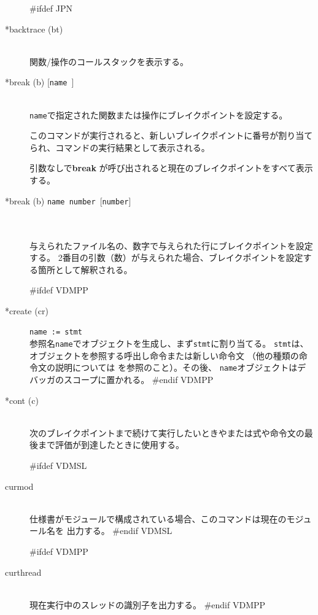 \documentclass[\pformat,12pt]{article}
\begin{document}
\begin{description}
#ifdef JPN
\item[*backtrace (bt)] \mbox{}\\
  関数/操作のコールスタックを表示する。
  
\item[*break (b) \mbox{[{\tt name }]}] 
\mbox{}\\
  {\tt name}で指定された関数または操作にブレイクポイントを設定する。\\
  
  このコマンドが実行されると、新しいブレイクポイントに番号が割り当てられ、コマンドの実行結果として表示される。

  引数なしで\textbf{break} が呼び出されると現在のブレイクポイントをすべて表示する。

\item[*break (b) \mbox{\texttt{name number} [\texttt{number}]}]\mbox{}\\
\mbox{}\\
 与えられたファイル名の、数字で与えられた行にブレイクポイントを設定する。
 2番目の引数（数）が与えられた場合、ブレイクポイントを設定する箇所として解釈される。
 
#ifdef VDMPP
\item[*create (cr)] {\tt name := stmt}\mbox{}\\
  参照名{\tt name}でオブジェクトを生成し、まず{\tt stmt}に割り当てる。
  {\tt stmt}は、オブジェクトを参照する呼出し命令または新しい命令文
  （他の種類の命令文の説明については\cite{LangManPP-CSK} を参照のこと）。その後、
  {\tt name}オブジェクトはデバッガのスコープに置かれる。
#endif VDMPP

\item[*cont (c)] \mbox{}\\
  次のブレイクポイントまで続けて実行したいときやまたは式や命令文の最後まで評価が到達したときに使用する。

#ifdef VDMSL
\item[curmod] \mbox{}\\
  仕様書がモジュールで構成されている場合、このコマンドは現在のモジュール名を
  出力する。
#endif VDMSL

#ifdef VDMPP
\item[curthread]\mbox{}\\
  現在実行中のスレッドの識別子を出力する。
#endif VDMPP


\end{description}
\end{document}
